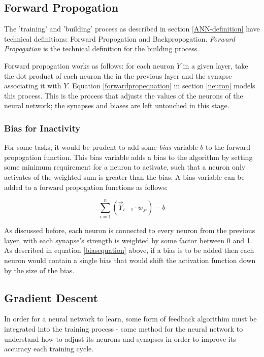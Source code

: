 \documentclass[12pt]{article}
\begin{document}
    \subsection{Forward Propogation \label{foreprop}}

        The 'training' and 'building' process as described in section \ref{ANN-definition} have technical definitions: Forward Propogation and Backpropogation. \textit{Forward Propogation} is the technical definition for the building process. 

        Forward propogation works as follows: for each neuron \(Y\) in a given layer, take the dot product of each neuron the in the previous layer and the synapse associating it with \(Y\). Equation \ref{forwardpropequation} in section \ref{neuron} models this process. This is the process that adjusts the values of the neurons of the neural network; the synapses and biases are left untouched in this stage.

        \subsubsection{Bias for Inactivity}
            For some tasks, it would be prudent to add some \textit{bias} variable \(b\) to the forward propogation function. This bias variable adds a bias to the algorithm by setting some minimum requirement for a neuron to activate, such that a neuron only activates of the weighted sum is greater than the bias. A bias variable can be added to a forward propogation functions as follows: 
            
            \begin{equation} \label{biasequation}
                \sum_{i=1}^{n}(\vec Y_{l-1} \cdot  w_{ji}) -b
            \end{equation}

            As discussed before, each neuron is connected to every neuron from the previous layer, with each synapse's strength is weighted by some factor between 0 and 1. As described in equation \ref{biasequation} above, if a bias is to be added then each neuron would contain a single bias that would shift the activation function down by the size of the bias. 


    \subsection{Gradient Descent \label{gradient-descent}}
    
        In order for a neural network to learn, some form of feedback algorithim must be integrated into the training process - some method for the neural network to understand how to adjust its neurons and synapses in order to improve its accuracy each training cycle.
        
\end{document}

